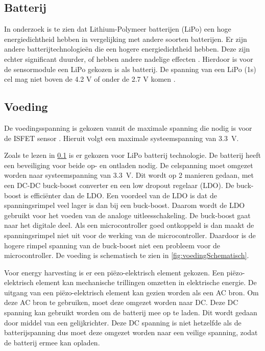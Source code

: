 \subsection{Batterij} \label{sec:battery}
In onderzoek \cite{BatteryComparison} is te zien dat Lithium-Polymeer batterijen (LiPo) een hoge energiedichtheid hebben in vergelijking met andere soorten batterijen. Er zijn andere batterijtechnologieën die een hogere energiedichtheid hebben. Deze zijn echter significant duurder, of hebben andere nadelige effecten \cite{BatteryComparison}. Hierdoor is voor de sensormodule een LiPo gekozen is als batterij. De spanning van een LiPo (1s) cel mag niet boven de 4.2 V of onder de 2.7 V komen \cite{BatteryComparison}.

\subsection{Voeding} \label{sec:voeding} 


De voedingsspanning is gekozen vanuit de maximale spanning die nodig is voor de ISFET sensor \cite{isfet}. Hieruit volgt een maximale systeemspanning van \qty{3.3}{\volt}. 


Zoals te lezen in \cref{sec:battery} is er gekozen voor LiPo batterij technologie. De batterij heeft een beveiliging voor beide op- en ontladen nodig. De celspanning moet omgezet worden naar systeemspanning van \qty{3.3}{\volt}. Dit wordt op 2 manieren gedaan, met een DC-DC buck-boost converter en een low dropout regelaar (LDO). De buck-boost is efficiënter dan de LDO. Een voordeel van de LDO is dat de spanningsrimpel veel lager is dan bij een buck-boost. Daarom wordt de LDO gebruikt voor het voeden van de analoge uitleesschakeling. De buck-boost gaat naar het digitale deel. Als een microcontroller goed ontkoppeld is dan maakt de spanningsrimpel niet uit voor de werking van de microcontroller. Daardoor is de hogere rimpel spanning van de buck-boost niet een probleem voor de microcontroller. De voeding is schematisch te zien in \cref{fig:voedingSchematisch}.

Voor energy harvesting is er een piëzo-elektrisch element gekozen. Een piëzo-elektrisch element kan mechanische trillingen omzetten in elektrische energie. De uitgang van een piëzo-elektrisch element kan gezien worden als een AC bron. Om deze AC bron te gebruiken, moet deze omgezet worden naar DC. Deze DC spanning kan gebruikt worden om de batterij mee op te laden. Dit wordt gedaan door middel van een gelijkrichter. Deze DC spanning is niet hetzelfde als de batterijspanning dus moet deze omgezet worden naar een veilige spanning, zodat de batterij ermee kan opladen.

